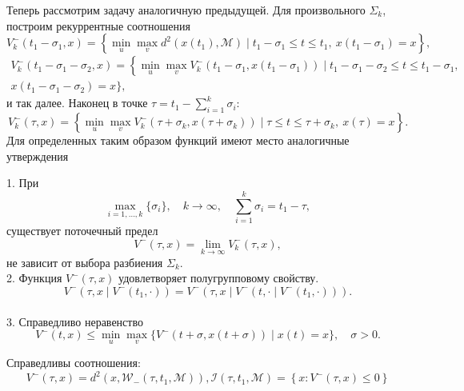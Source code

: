 Теперь рассмотрим задачу аналогичную предыдущей. Для произвольного \( \Sigma_k \), построим
 рекуррентные соотношения 
\begin{equation*}
    V_k^-(t_1 - \sigma_1, x) = \left\{ \min_u \max_v  d^2(x(t_1), \mathcal{M}) \mid t_1 -
     \sigma_1 \le t \le t_1, \ x(t_1 - \sigma_1) = x \right\},
\end{equation*}
\begin{multline*} 
    V_k^-(t_1 - \sigma_1 - \sigma_2, x) = \left\{ \min_u \max_v  V_k^-(t_1 - \sigma_1, x(t_1 -
     \sigma_1)) \mid t_1 - \sigma_1 - \sigma_2 \le t \le t_1 - \sigma_1, \right. \\ 
    x(t_1 - \sigma_1 - \sigma_2) = x \Big\},
\end{multline*}
и так далее. Наконец в точке \( \tau = t_1 - \sum\limits_{i = 1}^k \sigma_i \):
\begin{equation*}
    V_k^-(\tau, x) = \left\{ \min_u \max_v  V_k^- (\tau + \sigma_k, x(\tau + \sigma_k)) \mid
     \tau \le t \le \tau + \sigma_k, \ x(\tau) = x \right\}.
\end{equation*}
Для определенных таким образом функций имеют место аналогичные утверждения
\begin{lemma}
    1. При
    \[ 
        \max_{i = 1,\dots,k} \{\sigma_i\}, \quad k \to \infty, \quad \sum_{i = 1}^k \sigma_i = 
         t_1 - \tau, 
    \]
    существует поточечный предел
    \[
        V^-(\tau, x) = \lim_{k \to \infty} V_k^-(\tau, x),
    \]
    не зависит от выбора разбиения \( \Sigma_k \). \\
    2. Функция \( V^-(\tau, x) \) удовлетворяет полугрупповому свойству.
    \begin{equation}
        V^-(\tau, x \mid V^-(t_1, \cdot)) = V^-(\tau, x \mid V^-(t, \cdot \mid V^-(t_1, \cdot))).
    \end{equation} \\
    3. Справедливо неравенство
    \begin{equation}
        V^-(t,x) \le \min_u \max_v \{ V^-(t + \sigma, x(t + \sigma)) \mid x(t) = x \}, 
         \quad \sigma > 0.
    \end{equation}
\end{lemma}


\begin{lemma}
    Справедливы соотношения:
    \[
        V^-(\tau, x) = d^2(x, \mathcal{W}_-(\tau, t_1, \mathcal{M})),
        \mathcal{I}(\tau, t_1, \mathcal{M}) = \left\{ x : V^-(\tau, x) \le 0 \right\} 
    \]
\end{lemma}

